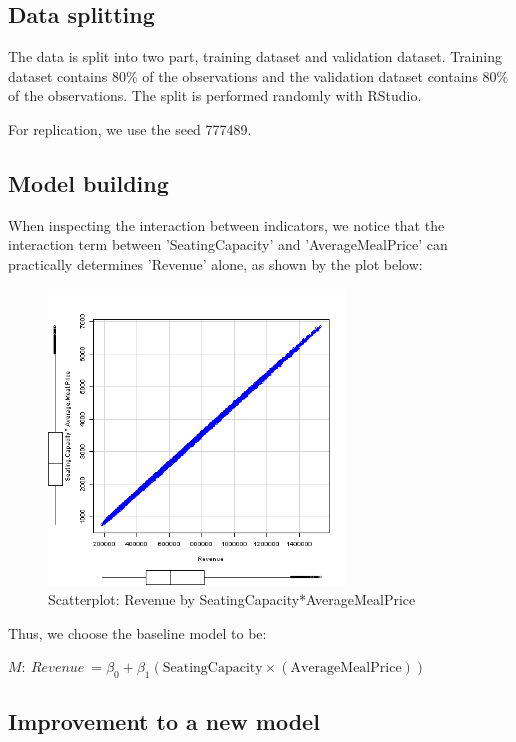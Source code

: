 \subsection{Data splitting}

The data is split into two part, training dataset and validation dataset. Training dataset contains 80$\%$ of the observations and the validation dataset contains 80$\%$ of the observations. The split is performed randomly with RStudio.

For replication, we use the seed 777489.

\subsection{Model building}
When inspecting the interaction between indicators, we notice that the interaction term between 'SeatingCapacity' and 'AverageMealPrice' can practically determines 'Revenue' alone, as shown by the plot below:

\begin{figure}[H]
\centering
\includegraphics[width=0.7\textwidth]{img/scattertrip.png}
\caption{Scatterplot: Revenue by SeatingCapacity*AverageMealPrice}
\label{fig:scaled_revenue_distribution}
\end{figure}

Thus, we choose the baseline model to be: 
\begin{center}
$
M: \ Revenue \ = \beta_0 + \beta_1 \left(\text{SeatingCapacity} \times(\text{AverageMealPrice})\right)
$
\end{center}

\subsection{Improvement to a new model}

